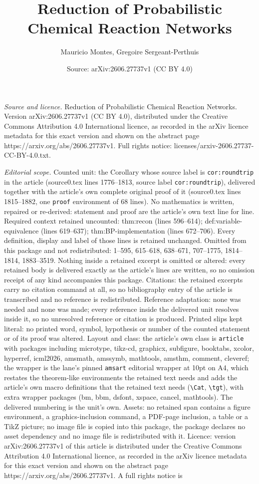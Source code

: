 \documentclass[10pt,a4paper]{amsart}
\title[Reduction of Probabilistic Chemical Reaction Networks]{Reduction of Probabilistic Chemical Reaction Networks}
\author{Mauricio Montes, Gregoire Sergeant-Perthuis}
\date{Source: arXiv:2606.27737v1 (CC BY 4.0)}
\begin{document}
\maketitle

\noindent\emph{Source and licence.} Reduction of Probabilistic Chemical Reaction Networks. Version arXiv:2606.27737v1 (CC BY 4.0), distributed under the Creative Commons Attribution 4.0 International licence, as recorded in the arXiv licence metadata for this exact version and shown on the abstract page https://arxiv.org/abs/2606.27737v1. Full rights notice: licenses/arxiv-2606.27737-CC-BY-4.0.txt.\par\smallskip

\noindent\textit{Editorial scope.} Counted unit: the Corollary whose source label is \texttt{cor:roundtrip} in the article (source0.tex lines 1776--1813, source label \texttt{cor:roundtrip}), delivered together with the article's own complete original proof of it (source0.tex lines 1815--1882, one \texttt{proof} environment of 68 lines). No mathematics is written, repaired or re-derived: statement and proof are the article's own text line for line. Required context retained uncounted: thm:recon (lines 596--614); def:variable-equivalence (lines 619--637); thm:BP-implementation (lines 672--706). Every definition, display and label of those lines is retained unchanged. Omitted from this package and not redistributed: 1--595, 615--618, 638--671, 707--1775, 1814--1814, 1883--3519. Nothing inside a retained excerpt is omitted or altered: every retained body is delivered exactly as the article's lines are written, so no omission receipt of any kind accompanies this package. Citations: the retained excerpts carry no citation command at all, so no bibliography entry of the article is transcribed and no reference is redistributed. Reference adaptation: none was needed and none was made; every reference inside the delivered unit resolves inside it, so no unresolved reference or citation is produced. Printed slips kept literal: no printed word, symbol, hypothesis or number of the counted statement or of its proof was altered. Layout and class: the article's own class is \texttt{article} with packages including microtype, tikz-cd, graphicx, subfigure, booktabs, xcolor, hyperref, icml2026, amsmath, amssymb, mathtools, amsthm, comment, cleveref; the wrapper is the lane's pinned \texttt{amsart} editorial wrapper at 10pt on A4, which restates the theorem-like environments the retained text needs and adds the article's own macro definitions that the retained text needs (\texttt{\textbackslash Cat}, \texttt{\textbackslash tgt}), with extra wrapper packages (bm, bbm, dsfont, xspace, cancel, mathtools). The delivered numbering is the unit's own. Assets: no retained span contains a figure environment, a graphics-inclusion command, a PDF-page inclusion, a table or a TikZ picture; no image file is copied into this package, the package declares no asset dependency and no image file is redistributed with it. Licence: version arXiv:2606.27737v1 of this article is distributed under the Creative Commons Attribution 4.0 International licence, as recorded in the arXiv licence metadata for this exact version and shown on the abstract page https://arxiv.org/abs/2606.27737v1. A full rights notice is 
\end{document}
